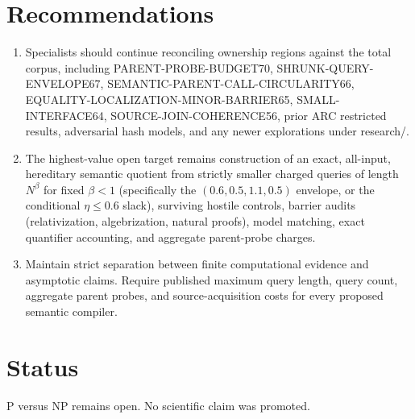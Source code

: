 \documentclass[11pt]{article}
\begin{document}
\section{Recommendations}
\begin{enumerate}
\item Specialists should continue reconciling ownership regions against the total corpus, including PARENT-PROBE-BUDGET70, SHRUNK-QUERY-ENVELOPE67, SEMANTIC-PARENT-CALL-CIRCULARITY66, EQUALITY-LOCALIZATION-MINOR-BARRIER65, SMALL-INTERFACE64, SOURCE-JOIN-COHERENCE56, prior ARC restricted results, adversarial hash models, and any newer explorations under research/.
\item The highest-value open target remains construction of an exact, all-input, hereditary semantic quotient from strictly smaller charged queries of length $N^\beta$ for fixed $\beta<1$ (specifically the $(0.6,0.5,1.1,0.5)$ envelope, or the conditional $\eta\le 0.6$ slack), surviving hostile controls, barrier audits (relativization, algebrization, natural proofs), model matching, exact quantifier accounting, and aggregate parent-probe charges.
\item Maintain strict separation between finite computational evidence and asymptotic claims. Require published maximum query length, query count, aggregate parent probes, and source-acquisition costs for every proposed semantic compiler.
\end{enumerate}

\section{Status}
P versus NP remains open. No scientific claim was promoted.

\end{document}
